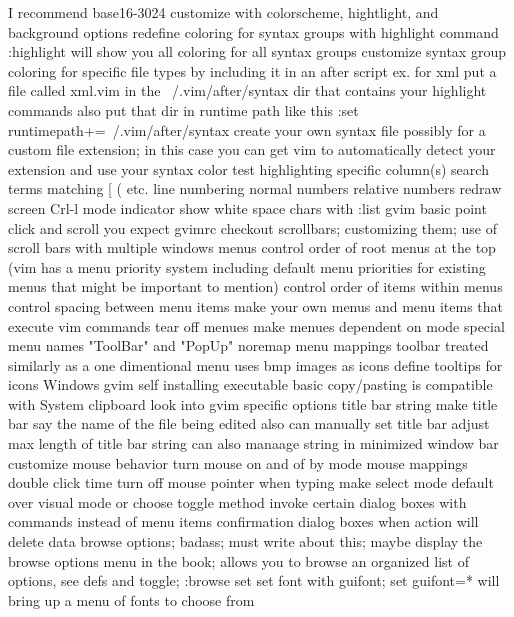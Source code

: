 \documentclass[12pt]{book}
\begin{document}
{      I recommend base16-3024
      customize with colorscheme, hightlight, and background options
      redefine coloring for syntax groups with highlight command
      :highlight will show you all coloring for all syntax groups
      customize syntax group coloring for specific file types by including it in an after script
        ex. for xml put a file called xml.vim in the ~/.vim/after/syntax dir that contains your highlight commands
        also put that dir in runtime path like this :set runtimepath+=~/.vim/after/syntax
      create your own syntax file
        possibly for a custom file extension; in this case you can get vim to automatically detect your extension and use your syntax
    color test
  highlighting
    specific column(s)
    search terms
    matching { [ ( etc.
  line numbering
    normal numbers
    relative numbers
  redraw screen Crl-l
  mode indicator
  show white space chars with :list
  gvim
    basic point click and scroll you expect
    gvimrc
    checkout scrollbars; customizing them; use of scroll bars with multiple windows
    menus
      control order of root menus at the top (vim has a menu priority system including default menu priorities for existing menus that might be important to mention)
      control order of items within menus
      control spacing between menu items
      make your own menus and menu items that execute vim commands
      tear off menues
      make menues dependent on mode
      special menu names "ToolBar" and "PopUp"
      noremap menu mappings
    toolbar
      treated similarly as a one dimentional menu
      uses bmp images as icons
      define tooltips for icons
    Windows gvim
      self installing executable
      basic copy/pasting is compatible with System clipboard
    look into gvim specific options
    title bar string
      make title bar say the name of the file being edited
      also can manually set title bar
      adjust max length of title bar string
      can also manaage string in minimized window bar
    customize mouse behavior
      turn mouse on and of by mode
      mouse mappings
      double click time
      turn off mouse pointer when typing
    make select mode default over visual mode or choose toggle method
    invoke certain dialog boxes with commands instead of menu items
    confirmation dialog boxes when action will delete data
    browse options; badass; must write about this; maybe display the browse options menu in the book; allows you to browse an organized list of options, see defs and toggle; :browse set
    set font with guifont; set guifont=* will bring up a menu of fonts to choose from
}}
\end{document}
